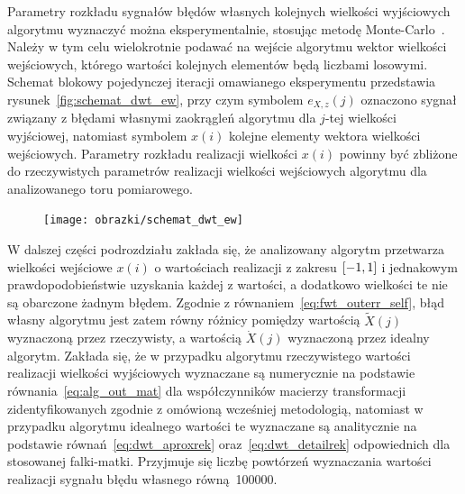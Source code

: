 Parametry rozkładu sygnałów błędów własnych kolejnych wielkości wyjściowych algorytmu wyznaczyć można eksperymentalnie, stosując metodę Monte-Carlo~\cite{jcgm_montecarlo}. Należy w tym celu wielokrotnie podawać na wejście algorytmu wektor wielkości wejściowych, którego wartości kolejnych elementów będą liczbami losowymi. Schemat blokowy pojedynczej iteracji omawianego eksperymentu przedstawia rysunek~\ref{fig:schemat_dwt_ew}, przy czym symbolem $e_{X,z}(j)$ oznaczono sygnał związany z błędami własnymi zaokrągleń algorytmu dla $j$-tej wielkości wyjściowej, natomiast symbolem $x(i)$ kolejne elementy wektora wielkości wejściowych. Parametry rozkładu realizacji wielkości $x(i)$ powinny być zbliżone do rzeczywistych parametrów realizacji wielkości wejściowych algorytmu dla analizowanego toru pomiarowego.

\begin{figure}[htb!]
\begin{center}
\texttt{[image: obrazki/schemat\_dwt\_ew]}
\end{center}
\end{figure}

W dalszej części podrozdziału zakłada się, że analizowany algorytm przetwarza wielkości wejściowe $x(i)$ o wartościach realizacji z zakresu $\interval{-1}{1}$ i jednakowym prawdopodobieństwie uzyskania każdej z wartości, a dodatkowo wielkości te nie są obarczone żadnym błędem. Zgodnie z równaniem~\eqref{eq:fwt_outerr_self}, błąd własny algorytmu jest zatem równy różnicy pomiędzy wartością $\tilde{X}(j)$ wyznaczoną przez rzeczywisty, a wartością $\dot{X}(j)$ wyznaczoną przez idealny algorytm. Zakłada się, że w przypadku algorytmu rzeczywistego wartości realizacji wielkości wyjściowych wyznaczane są numerycznie na podstawie równania~\eqref{eq:alg_out_mat} dla współczynników macierzy transformacji zidentyfikowanych zgodnie z omówioną wcześniej metodologią, natomiast w przypadku algorytmu idealnego wartości te wyznaczane są analitycznie na podstawie równań~\eqref{eq:dwt_aproxrek} oraz~\eqref{eq:dwt_detailrek} odpowiednich dla stosowanej falki-matki. Przyjmuje się liczbę powtórzeń wyznaczania wartości realizacji sygnału błędu własnego równą~\num{100000}.

